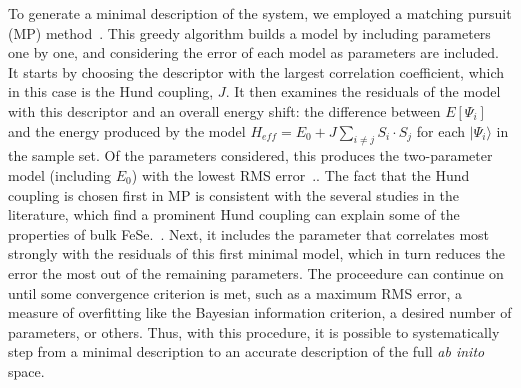 To generate a minimal description of the system, we employed a matching pursuit (MP) method~\cite{MP_Zhang1993}.
This greedy algorithm builds a model by including parameters one by one, and considering the error of each model as parameters are included.
It starts by choosing the descriptor with the largest correlation coefficient, which in this case is the Hund coupling, $J$.
It then examines the residuals of the model with this descriptor and an overall energy shift: the difference between $E[\Psi_i]$ and the energy produced by the model $H_{eff} = E_0 + J \sum_{i\ne j}S_i \cdot S_j$ for each $|\Psi_i\rangle$ in the sample set.
Of the parameters considered, this produces the two-parameter model (including $E_0$) with the lowest RMS error~\cite{MP_Zhang1993}..
The fact that the Hund coupling is chosen first in MP is consistent with the several studies in the literature, which find a prominent Hund coupling can explain some of the properties of bulk FeSe.~\cite{demedici_hunds_2011,de_medici_janus-faced_2011,georges_strong_2013,busemeyer_competing_2016}.
Next, it includes the parameter that correlates most strongly with the residuals of this first minimal model, which in turn reduces the error the most out of the remaining parameters. 
The proceedure can continue on until some convergence criterion is met, such as a maximum RMS error, a measure of overfitting like the Bayesian information criterion, a desired number of parameters, or others.
Thus, with this procedure, it is possible to systematically step from a minimal description to an accurate description of the full \textit{ab inito} space.

